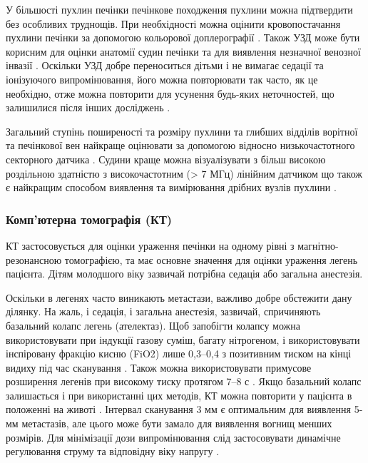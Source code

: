 У більшості пухлин печінки печінкове походження пухлини можна підтвердити без особливих труднощів. При необхідності можна оцінити кровопостачання пухлини печінки за допомогою кольорової доплерографії \cite{pmid22648963}. Також УЗД може бути корисним для оцінки анатомії судин печінки та для виявлення незначної венозної інвазії \cite{pmid16123986}. Оскільки УЗД добре переноситься дітьми і не вимагає седації та іонізуючого випромінювання, його можна повторювати так часто, як це необхідно, отже можна повторити для усунення будь-яких неточностей, що залишилися після інших досліджень \cite{pmid16176410}.

Загальний ступінь поширеності та розміру пухлини та глибших відділів ворітної та печінкової вен найкраще оцінювати за допомогою відносно низькочастотного секторного датчика \cite{pmid16185597}. Судини краще можна візуалізувати з більш високою роздільною здатністю з високочастотним (> 7 МГц) лінійним датчиком що також є найкращим способом виявлення та вимірювання дрібних вузлів пухлини \cite{pmid16404555}.
\subsubsection{Комп’ютерна томографія (КТ)} 

КТ застосовується для оцінки ураження печінки на одному рівні з магнітно-резонансною томографією, та має основне значення для оцінки ураження легень пацієнта. Дітям молодшого віку зазвичай потрібна седація або загальна анестезія.

Оскільки в легенях часто виникають метастази, важливо добре обстежити дану ділянку. На жаль, і седація, і загальна анестезія, зазвичай, спричиняють базальний колапс легень (ателектаз).  Щоб запобігти колапсу можна використовувати при індукції газову суміш, багату нітрогеном, і використовувати інспіровану фракцію кисню (FiO2) лише 0,3–0,4 з позитивним тиском на кінці видиху під час сканування \cite{pmid16651244}. Також можна використовувати примусове розширення легенів при високому тиску протягом 7–8 с \cite{pmid15285242}. Якщо базальний колапс залишається і при використанні цих методів, КТ можна повторити у пацієнта в положенні на животі \cite{pmid16712615}.
Інтервал сканування 3 мм є оптимальним для виявлення 5-мм метастазів, але цього може бути замало для виявлення вогнищ менших розмірів. Для мінімізації дози випромінювання слід застосовувати динамічне регулювання струму та відповідну віку напругу \cite{pmid16794509}.

